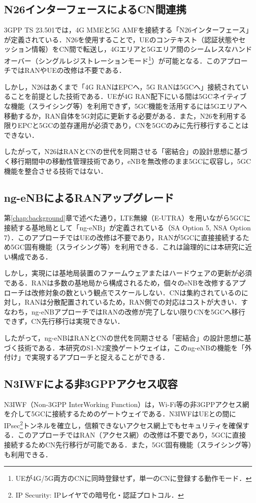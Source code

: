 \subsection{N26インターフェースによるCN間連携}
3GPP TS 23.501では，4G MMEと5G AMFを接続する「N26インターフェース」が定義されている\cite{3GPP_TS23501_R15}．N26を使用することで，UEのコンテキスト（認証状態やセッション情報）をCN間で転送し，4Gエリアと5Gエリア間のシームレスなハンドオーバー（シングルレジストレーションモード\footnote{UEが4G/5G両方のCNに同時登録せず，単一のCNに登録する動作モード．}）が可能となる．このアプローチではRANやUEの改修は不要である．

しかし，N26はあくまで「4G RANはEPCへ，5G RANは5GCへ」接続されていることを前提とした技術である．UEが4G RAN配下にいる間は5GCネイティブな機能（スライシング等）を利用できず，5GC機能を活用するには5Gエリアへ移動するか，RAN自体を5G対応に更新する必要がある．また，N26を利用する限りEPCと5GCの並存運用が必須であり，CNを5GCのみに先行移行することはできない．

したがって，N26はRANとCNの世代を同期させる「密結合」の設計思想に基づく移行期間中の移動性管理技術であり，eNBを無改修のまま5GCに収容し，5GC機能を整合させる技術ではない．

\subsection{ng-eNBによるRANアップグレード}
第\ref{chap:background}章で述べた通り，LTE無線（E-UTRA）を用いながら5GCに接続する基地局として「ng-eNB」が定義されている（SA Option 5, NSA Option 7）．このアプローチではUEの改修は不要であり，RANが5GCに直接接続するため5GC固有機能（スライシング等）を利用できる．これは論理的には本研究に近い構成である．

しかし，実現には基地局装置のファームウェアまたはハードウェアの更新が必須である．RANは多数の基地局から構成されるため，個々のeNBを改修するアプローチは改修対象の数という観点でスケールしない．CNは集約されているのに対し，RANは分散配置されているため，RAN側での対応はコストが大きい．すなわち，ng-eNBアプローチではRANの改修が完了しない限りCNを5GCへ移行できず，CN先行移行は実現できない．

したがって，ng-eNBはRANとCNの世代を同期させる「密結合」の設計思想に基づく技術である．本研究のS1-N2変換ゲートウェイは，このng-eNBの機能を「外付け」で実現するアプローチと捉えることができる．

\subsection{N3IWFによる非3GPPアクセス収容}
N3IWF（Non-3GPP InterWorking Function）は，Wi-Fi等の非3GPPアクセス網を介して5GCに接続するためのゲートウェイである\cite{3GPP_TS23501_R15}．N3IWFはUEとの間にIPsec\footnote{IP Security: IPレイヤでの暗号化・認証プロトコル．}トンネルを確立し，信頼できないアクセス網上でもセキュリティを確保する．このアプローチではRAN（アクセス網）の改修は不要であり，5GCに直接接続するためCN先行移行が可能である．また，5GC固有機能（スライシング等）も利用できる．

